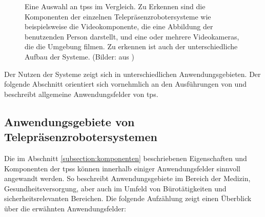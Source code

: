 \begin{figure}[ht]
\begin{minipage}[t]{.25\linewidth}
      \label{fig:z} 
   \end{minipage}%
   \hfill
   \caption{Eine Auswahl an \aclp{tps} im Vergleich. Zu Erkennen sind die Komponenten der einzelnen Telepräsenzrobotersysteme wie beispielsweise die Videokomponente, die eine Abbildung der benutzenden Person darstellt, und eine oder mehrere Videokameras, die die Umgebung filmen. Zu erkennen ist auch der unterschiedliche Aufbau der Systeme. (Bilder: aus  \cite{Kristoffersson2013})}\label{fig:bilder} 
\end{figure} 

Der Nutzen der Systeme zeigt sich in unterschiedlichen Anwendungsgebieten. Der folgende Abschnitt orientiert sich vornehmlich an den Ausführungen von \cite{Kristoffersson2013} und beschreibt allgemeine Anwendungsfelder von \acs{tps}.

\subsection{Anwendungsgebiete von Telepräsenzrobotersystemen}
\label{section:anwendungTPS} 

Die im Abschnitt \ref{subsection:komponenten} beschriebenen Eigenschaften und Komponenten der \aclp{tps} können innerhalb einiger Anwendungsfelder sinnvoll angewandt werden. So beschreibt \cite{Kristoffersson2013} Anwendungsgebiete im Bereich der Medizin, Gesundheitsversorgung, aber auch im Umfeld von Bürotätigkeiten und sicherheitsrelevanten Bereichen. Die folgende Aufzählung zeigt einen Überblick über die erwähnten Anwendungsfelder: %

